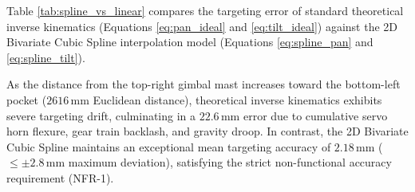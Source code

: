 Table \ref{tab:spline_vs_linear} compares the targeting error of standard theoretical inverse kinematics (Equations \ref{eq:pan_ideal} and \ref{eq:tilt_ideal}) against the 2D Bivariate Cubic Spline interpolation model (Equations \ref{eq:spline_pan} and \ref{eq:spline_tilt}).

\begin{table}[H]
\centering
\caption{Laser Spot Targeting Deviation: Theoretical Kinematics vs. 2D Bivariate Spline}
\label{tab:spline_vs_linear}
\end{table}

As the distance from the top-right gimbal mast increases toward the bottom-left pocket ($2616\,\text{mm}$ Euclidean distance), theoretical inverse kinematics exhibits severe targeting drift, culminating in a $22.6\,\text{mm}$ error due to cumulative servo horn flexure, gear train backlash, and gravity droop. In contrast, the 2D Bivariate Cubic Spline maintains an exceptional mean targeting accuracy of $2.18\,\text{mm}$ ($\le \pm 2.8\,\text{mm}$ maximum deviation), satisfying the strict non-functional accuracy requirement (NFR-1).

